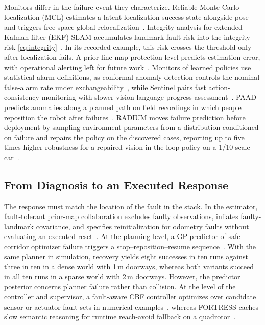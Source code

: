 Monitors differ in the failure event they characterize. Reliable Monte Carlo localization (MCL) estimates a latent localization-success state alongside pose and triggers free-space global relocalization~\cite{P_M35}. Integrity analysis for extended Kalman filter (EKF) SLAM accumulates landmark fault risk into the integrity risk \eqref{eq:integrity}~\cite{P_X07}. In its recorded example, this risk crosses the threshold only after localization fails. A prior-line-map protection level predicts estimation error, with operational alerting left for future work~\cite{P_F01}. Monitors of learned policies use statistical alarm definitions, as conformal anomaly detection controls the nominal false-alarm rate under exchangeability~\cite{P_E54}, while Sentinel pairs fast action-consistency monitoring with slower vision-language progress assessment~\cite{P_F07}. PAAD predicts anomalies along a planned path on field recordings in which people reposition the robot after failures~\cite{P_N18}. RADIUM moves failure prediction before deployment by sampling environment parameters from a distribution conditioned on failure and repairs the policy on the discovered cases, reporting up to five times higher robustness for a repaired vision-in-the-loop policy on a 1/10-scale car~\cite{P_R36}.

\subsection{From Diagnosis to an Executed Response}

The response must match the location of the fault in the stack. In the estimator, fault-tolerant prior-map collaboration excludes faulty observations, inflates faulty-landmark covariance, and specifies reinitialization for odometry faults without evaluating an executed reset~\cite{P_F03}. At the planning level, a GP predictor of safe-corridor optimizer failure triggers a stop--reposition--resume sequence~\cite{P_E59}. With the same planner in simulation, recovery yields eight successes in ten runs against three in ten in a dense world with 1\,m doorways, whereas both variants succeed in all ten runs in a sparse world with 2\,m doorways. However, the predictor posterior concerns planner failure rather than collision. At the level of the controller and supervisor, a fault-aware CBF controller optimizes over candidate sensor or actuator fault sets in numerical examples~\cite{P_E55}, whereas FORTRESS caches slow semantic reasoning for runtime reach-avoid fallback on a quadrotor~\cite{P_E60}.

